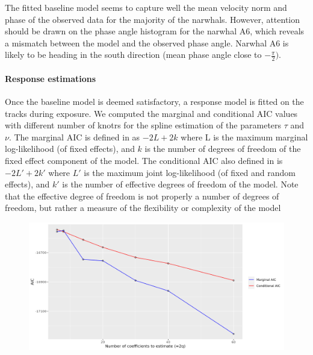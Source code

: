 \documentclass[11pt]{article}
\newcommand {\1}{\mathbb{1}}
\begin{document}
The fitted baseline model seems to capture well the mean velocity norm and phase of the observed data for the majority of the narwhals. However, attention should be drawn on the phase angle histogram for the narwhal A6, which reveals a mismatch between the model and the observed phase angle. Narwhal A6 is likely to be heading in the south direction (mean phase angle close to $-\frac{\pi}{2})$. 


\paragraph{Response estimations}


Once the baseline model is deemed satisfactory, a response model is fitted on the tracks during exposure. We computed the marginal and conditional AIC values with different number of knotrs for the spline estimation of the parameters $\tau$ and $\nu$. The marginal AIC is defined in \cite{wood_generalized_2017} as $- 2L + 2k$ where L is the maximum marginal log-likelihood (of fixed effects), and $k$ is the number of degrees of freedom of the fixed effect component of the model. The conditional AIC also defined in \cite{wood_generalized_2017} is $- 2L' + 2k'$ where $L'$ is the maximum joint log-likelihood (of fixed and random effects), and $k'$ is the number of effective degrees of freedom of the model. Note that  the effective degree of freedom is not properly a number of degrees of freedom, but rather a measure of the flexibility or complexity of the model %

\begin{figure}[H]
	\centering
	\includegraphics[scale=0.45]{images/unconstrained_models/response/plotAIC3.png}
	\caption{}
	\label{fig: plotAIC3}
\end{figure}
\end{document}
